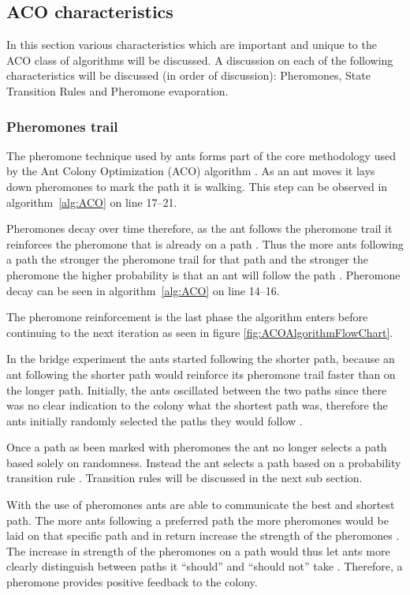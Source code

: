 \subsection{ACO characteristics}
\label{sec:ACOcharacter}
In this section various characteristics which are important and unique to the ACO class of algorithms will be discussed. A discussion on each of the following characteristics will be discussed (in order of discussion): Pheromones, State Transition Rules and Pheromone evaporation.
\subsubsection{Pheromones trail}
\label{sec:pheromonetrail}
The pheromone technique used by ants forms part of the core methodology used by the Ant Colony Optimization (ACO) algorithm \cite{AntQAP}. As an ant moves it lays down pheromones to mark the path it is walking. This step can be observed in algorithm~\ref{alg:ACO} on line 17--21.

Pheromones decay over time therefore, as the ant follows the pheromone trail it reinforces the pheromone that is already on a path \cite{AntQAP}. Thus the more ants following a path the stronger the pheromone trail for that path and the stronger the pheromone the higher probability is that an ant will follow the path \cite{AntQAP}. Pheromone decay can be seen in algorithm~\ref{alg:ACO} on line 14--16.

The pheromone reinforcement is the last phase the algorithm enters before continuing to the next iteration as seen in figure \ref{fig:ACOAlgorithmFlowChart}.

In the bridge experiment the ants started following the shorter path, because an ant following the shorter path would reinforce its pheromone trail faster than on the longer path. Initially, the ants oscillated between the two paths since there was no clear indication to the colony what the shortest path was, therefore the ants initially randomly selected the paths they would follow \cite{AntQAP}.

Once a path as been marked with pheromones the ant no longer selects a path based solely on randomness. Instead the ant selects a path based on a probability transition rule \cite{AntsAndStigmergy}. Transition rules will be discussed in the next sub section.

With the use of pheromones ants are able to communicate the best and shortest path. The more ants following a preferred path the more pheromones would be laid on that specific path and in return increase the strength of the pheromones \cite{ImpACOComplex}. The increase in strength of the pheromones on a path would thus let ants more clearly distinguish between paths it “should” and “should not” take \cite{ImpACOComplex}. Therefore, a pheromone provides positive feedback to the colony.

